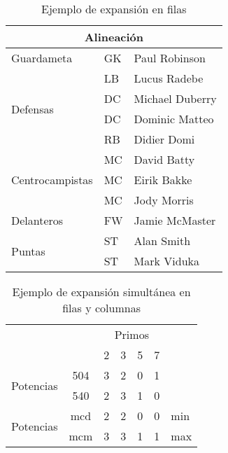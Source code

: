\documentclass[11pt,a4paper]{article}
\begin{document}
\begin{table}[hbt]%
	\centering
	\caption{Ejemplo de expansión en filas}
	\label{tab:expfilas}
	\begin{tabular}{|l|l|l|} %
	\hline
	\multicolumn{3}{|c|}{Alineación} \\
	\hline
	Guardameta & GK & Paul Robinson \\ \hline
	\multirow{4}{*}{Defensas} & LB & Lucus Radebe \\
	 & DC & Michael Duberry \\
	 & DC & Dominic Matteo \\
	 & RB & Didier Domi \\ \hline
	\multirow{3}{*}{Centrocampistas} & MC & David Batty \\
	 & MC & Eirik Bakke \\
	 & MC & Jody Morris \\ \hline
	Delanteros & FW & Jamie McMaster \\ \hline
	\multirow{2}{*}{Puntas} & ST & Alan Smith \\
	 & ST & Mark Viduka \\
	\hline
	\end{tabular}
\end{table}




\newpage

\begin{table}[hbt]%
	\centering
	\caption{Ejemplo de expansión simultánea en filas y columnas}
	\label{tab:expsimul}
	\begin{tabular}{cc|c|c|c|c|l} %
	\cline{3-6}
	& & \multicolumn{4}{|c|}{Primos} \\ \cline{3-6}
	& & 2 & 3 & 5 & 7 \\ \cline{1-6}
	\multicolumn{1}{|c|}{\multirow{2}{*}{Potencias}} &
	\multicolumn{1}{|c|}{504} & 3 & 2 & 0 & 1 &     \\ \cline{2-6}
	\multicolumn{1}{|c|}{}                        &
	\multicolumn{1}{|c|}{540} & 2 & 3 & 1 & 0 &     \\ \cline{1-6}
	\multicolumn{1}{|c|}{\multirow{2}{*}{Potencias}} &
	\multicolumn{1}{|c|}{mcd} & 2 & 2 & 0 & 0 & min \\ \cline{2-6}
	\multicolumn{1}{|c|}{}                        &
	\multicolumn{1}{|c|}{mcm} & 3 & 3 & 1 & 1 & max \\ \cline{1-6}
	\end{tabular}
\end{table}
\end{document}
